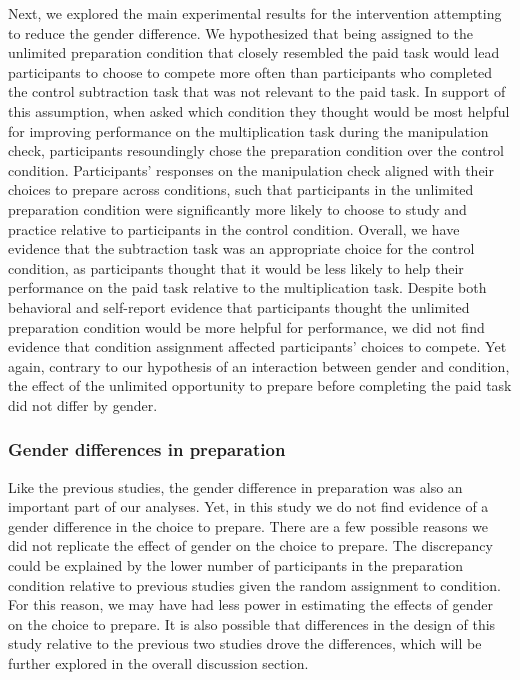 \documentclass[a4paper, nobind]{templates/ociamthesis}
\begin{document}
Next, we explored the main experimental results for the intervention attempting to reduce the gender difference. We hypothesized that being assigned to the unlimited preparation condition that closely resembled the paid task would lead participants to choose to compete more often than participants who completed the control subtraction task that was not relevant to the paid task. In support of this assumption, when asked which condition they thought would be most helpful for improving performance on the multiplication task during the manipulation check, participants resoundingly chose the preparation condition over the control condition. Participants' responses on the manipulation check aligned with their choices to prepare across conditions, such that participants in the unlimited preparation condition were significantly more likely to choose to study and practice relative to participants in the control condition. Overall, we have evidence that the subtraction task was an appropriate choice for the control condition, as participants thought that it would be less likely to help their performance on the paid task relative to the multiplication task. Despite both behavioral and self-report evidence that participants thought the unlimited preparation condition would be more helpful for performance, we did not find evidence that condition assignment affected participants' choices to compete. Yet again, contrary to our hypothesis of an interaction between gender and condition, the effect of the unlimited opportunity to prepare before completing the paid task did not differ by gender.

\hypertarget{gender-differences-in-preparation-4}{%
\subsubsection{Gender differences in preparation}\label{gender-differences-in-preparation-4}}

Like the previous studies, the gender difference in preparation was also an important part of our analyses. Yet, in this study we do not find evidence of a gender difference in the choice to prepare. There are a few possible reasons we did not replicate the effect of gender on the choice to prepare. The discrepancy could be explained by the lower number of participants in the preparation condition relative to previous studies given the random assignment to condition. For this reason, we may have had less power in estimating the effects of gender on the choice to prepare. It is also possible that differences in the design of this study relative to the previous two studies drove the differences, which will be further explored in the overall discussion section.
\end{document}
